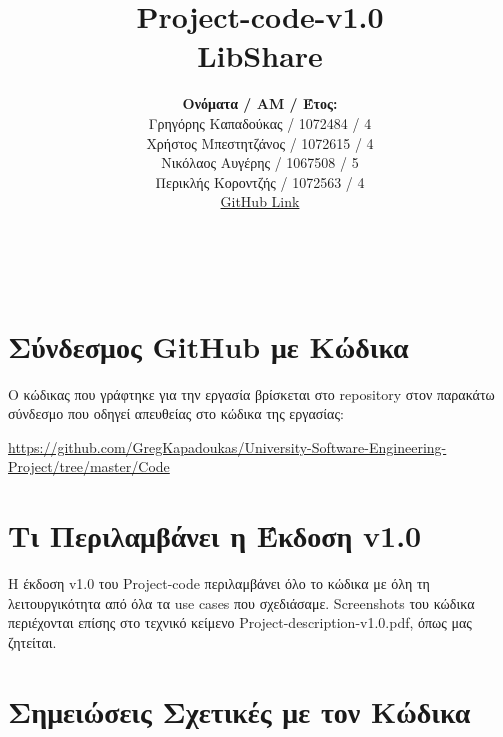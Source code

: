 \documentclass[12pt,a4paper]{article}
\title{Project-code-v1.0 \\ LibShare}
\author{\textbf{Ονόματα / ΑΜ / Έτος:} \\ Γρηγόρης Καπαδούκας / 1072484 / 4\textdegree \\ Χρήστος Μπεστητζάνος / 1072615 / 4\textdegree \\ Νικόλαος Αυγέρης / 1067508 / 5\textdegree \\ Περικλής Κοροντζής / 1072563 / 4\textdegree\\ \href{https://github.com/GregKapadoukas/University-Software-Engineering-Project}{\color{blue}GitHub Link}}
\begin{document}
\makeatletter
\begin{center}
	\LARGE{\@title} \\
	\pagebreak
    \begin{LARGE}\@author\end{LARGE}
    \pagebreak
\end{center}

\section{Σύνδεσμος GitHub με Κώδικα}
Ο κώδικας που γράφτηκε για την εργασία βρίσκεται στο repository στον παρακάτω σύνδεσμο που οδηγεί απευθείας στο κώδικα της εργασίας:

\textcolor{blue}{\href{https://github.com/GregKapadoukas/University-Software-Engineering-Project/tree/master/Code}{https://github.com/GregKapadoukas/University-Software-Engineering-\\Project/tree/master/Code}}

\section{Τι Περιλαμβάνει η Έκδοση v1.0}

Η έκδοση v1.0 του Project-code περιλαμβάνει όλο το κώδικα με όλη τη λειτουργικότητα από όλα τα use cases που σχεδιάσαμε. Screenshots του κώδικα περιέχονται επίσης στο τεχνικό κείμενο Project-description-v1.0.pdf, όπως μας ζητείται.

\section{Σημειώσεις Σχετικές με τον Κώδικα}
\label{Notes}
\end{document}
